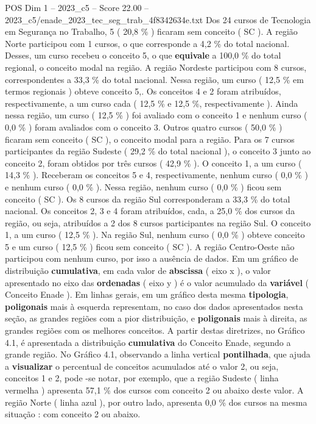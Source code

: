 \begin{textsample}{POS Dim 1 – 2023\_c5 – Score 22.00 – 2023\_c5/enade\_2023\_tec\_seg\_trab\_4f8342634e.txt}
Dos 24 cursos de Tecnologia em Segurança no Trabalho, 5 ( 20,8 \% ) ficaram sem conceito ( SC ).
A região Norte participou com 1 cursos, o que corresponde a 4,2 \% do total nacional.
Desses, um curso recebeu o conceito 5, o que \textbf{equivale} a 100,0 \% do total regional, o conceito modal na região.
A região Nordeste participou com 8 cursos, correspondentes a 33,3 \% do total nacional.
Nessa região, um curso ( 12,5 \% em termos regionais ) obteve conceito 5,.
Os conceitos 4 e 2 foram atribuídos, respectivamente, a um curso cada ( 12,5 \% e 12,5 \%, respectivamente ).
Ainda nessa região, um curso ( 12,5 \% ) foi avaliado com o conceito 1 e nenhum curso ( 0,0 \% ) foram avaliados com o conceito 3.
Outros quatro cursos ( 50,0 \% ) ficaram sem conceito ( SC ), o conceito modal para a região.
Para os 7 cursos participantes da região Sudeste ( 29,2 \% do total nacional ), o conceito 3 junto ao conceito 2, foram obtidos por três cursos ( 42,9 \% ).
O conceito 1, a um curso ( 14,3 \% ).
Receberam os conceitos 5 e 4, respectivamente, nenhum curso ( 0,0 \% ) e nenhum curso ( 0,0 \% ).
Nessa região, nenhum curso ( 0,0 \% ) ficou sem conceito ( SC ).
Os 8 cursos da região Sul corresponderam a 33,3 \% do total nacional.
Os conceitos 2, 3 e 4 foram atribuídos, cada, a 25,0 \% dos cursos da região, ou seja, atribuídos a 2 dos 8 cursos participantes na região Sul.
O conceito 1, a um curso ( 12,5 \% ).
Na região Sul, nenhum curso ( 0,0 \% ) obteve conceito 5 e um curso ( 12,5 \% ) ficou sem conceito ( SC ).
A região Centro-Oeste não participou com nenhum curso, por isso a ausência de dados.
Em um gráfico de distribuição \textbf{cumulativa}, em cada valor de \textbf{abscissa} ( eixo x ), o valor apresentado no eixo das \textbf{ordenadas} ( eixo y ) é o valor acumulado da \textbf{variável} ( Conceito Enade ).
Em linhas gerais, em um gráfico desta mesma \textbf{tipologia}, \textbf{poligonais} mais à esquerda representam, no caso dos dados apresentados nesta seção, as grandes regiões com a pior distribuição, e \textbf{poligonais} mais à direita, as grandes regiões com os melhores conceitos.
A partir destas diretrizes, no Gráfico 4.1, é apresentada a distribuição \textbf{cumulativa} do Conceito Enade, segundo a grande região.
No Gráfico 4.1, observando a linha vertical \textbf{pontilhada}, que ajuda a \textbf{visualizar} o percentual de conceitos acumulados até o valor 2, ou seja, conceitos 1 e 2, pode -se notar, por exemplo, que a região Sudeste ( linha vermelha ) apresenta 57,1 \% dos cursos com conceito 2 ou abaixo deste valor.
A região Norte ( linha azul ), por outro lado, apresenta 0,0 \% dos cursos na mesma situação : com conceito 2 ou abaixo.

\end{textsample}
